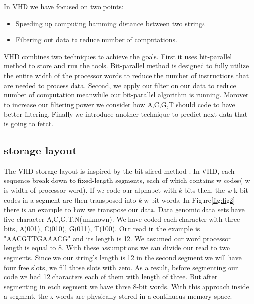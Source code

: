 In VHD we have focused on two points:
\begin{itemize}
\item Speeding up computing hamming distance between two strings
\item Filtering out data to reduce number of computations.
\end{itemize}
  
 VHD combines two techniques to achieve the goals. First it uses bit-parallel method to store and run the tools. Bit-parallel method is designed to fully utilize the entire width of the processor words to reduce the number of instructions that are needed to process data. Second, we apply  our filter on our data to reduce number of computation meanwhile our bit-parallel algorithm is running. Morover to increase our filtering power we consider how A,C,G,T should code to have better filtering. Finally we introduce another technique to predict next data that is going to fetch.
 
 \subsection{storage layout}
The VHD storage layout is inspired by the bit-sliced method \cite{O_Neil_1997}. In VHD, each sequence break down to fixed-length segments, each of which contains w codes( w is width of processor word). If we code our alphabet with \emph{k} bits then, the \emph{w} k-bit codes in a segment are then transposed into \emph{k} w-bit words. In Figure\ref{fig:fig2} there is an example to how we transpose our data. Data genomic data sets have five character A,C,G,T,N(unknown). We have coded each character with three bits, A(001), C(010), G(011), T(100). Our read in the example is "AACGTTGAAACG" and its length is 12. We assumed our word processor length is equal to 8. With these assumptions we can divide our read to two segments. Since we our string's length is 12 in the second segment we will have four free slots, we fill those slots with zero. As a result, before segmenting our code we had 12 characters each of them with length of three. But after segmenting in each segment we have three 8-bit words. With this approach inside a segment, the k words are physically stored in a continuous memory space.
 
  
  
  
  